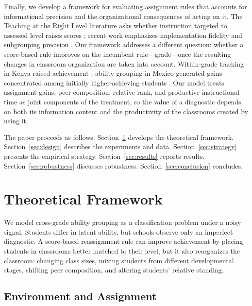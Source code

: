\documentclass[11pt]{article}
\begin{document}
Finally, we develop a framework for evaluating assignment rules that accounts for informational precision and the organizational consequences of acting on it. The Teaching at the Right Level literature asks whether instruction targeted to assessed level raises scores \citep{banerjee2017proof,duflo2020experimental}; recent work emphasizes implementation fidelity and subgrouping precision \citep{angristmeager2023}. Our framework addresses a different question: whether a score-based rule improves on the incumbent rule---grade---once the resulting changes in classroom organization are taken into account. Within-grade tracking in Kenya raised achievement \citep{duflo2011peer}; ability grouping in Mexico generated gains concentrated among initially higher-achieving students \citep{bussofrisancho2023}. Our model treats assignment gains, peer composition, relative rank, and productive instructional time as joint components of the treatment, so the value of a diagnostic depends on both its information content and the productivity of the classrooms created by using it.

The paper proceeds as follows. Section~\ref{sec:theory} develops the theoretical framework. Section~\ref{sec:design} describes the experiments and data. Section~\ref{sec:strategy} presents the empirical strategy. Section~\ref{sec:results} reports results. Section~\ref{sec:robustness} discusses robustness. Section~\ref{sec:conclusion} concludes.

\section{Theoretical Framework}
\label{sec:theory}

We model cross-grade ability grouping as a classification problem under a noisy signal. Students differ in latent ability, but schools observe only an imperfect diagnostic. A score-based reassignment rule can improve achievement by placing students in classrooms better matched to their level, but it also reorganizes the classroom: changing class sizes, mixing students from different developmental stages, shifting peer composition, and altering students' relative standing.

\subsection{Environment and Assignment}
\end{document}
